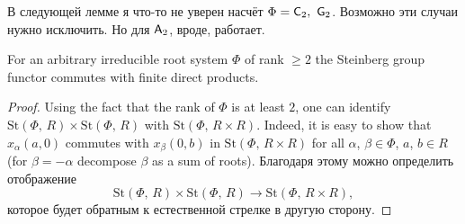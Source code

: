\documentclass[oneside, 11pt]{amsart}
\begin{document}
В следующей лемме я что-то не уверен насчёт $\Phi=\mathsf{C}_2,\ \mathsf{G}_2$. Возможно эти случаи нужно исключить. Но для $\mathsf{A}_2$, вроде, работает.

\begin{lemma} \label{lem:fprod} For an arbitrary irreducible root system $\Phi$ of rank $\geq 2$ the Steinberg group functor commutes with finite direct products. \end{lemma}
\begin{proof} Using the fact that the rank of $\Phi$ is at least $2$, one can identify $\mathrm{St}(\Phi,\,R)\times\mathrm{St}(\Phi,\,R)$ with $\mathrm{St}(\Phi,\,R\times R)$. Indeed, it is easy to show that $x_{\alpha}(a,0)$ commutes with $x_\beta(0,b)$ in $\mathrm{St}(\Phi,\,R\times R)$ for all $\alpha$, $\beta\in\Phi$, $a$, $b\in R$ (for $\beta=-\alpha$ decompose $\beta$ as a sum of roots). Благодаря этому можно определить отображение $$\mathrm{St}(\Phi,\,R)\times\mathrm{St}(\Phi,\,R)\rightarrow\mathrm{St}(\Phi,\,R\times R),$$ которое будет обратным к естественной стрелке в другую сторону. \end{proof}
\end{document}
